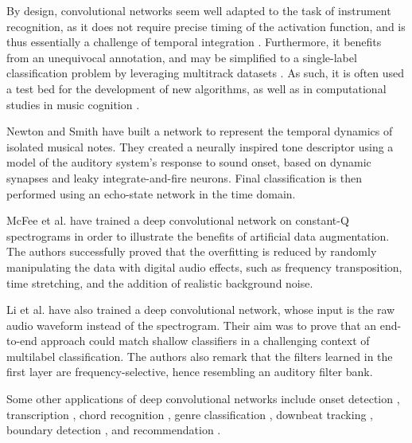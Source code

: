 \documentclass{article}
\makeatletter
\newcommand*{\etal}{et al.\@\xspace}
\makeatother
\begin{document}
By design, convolutional networks seem well adapted to the task of
instrument recognition, as it does not require precise timing of the activation function,
and is thus essentially a challenge of temporal integration \cite{Eronen2000, Joder2009}.
Furthermore, it benefits from an unequivocal annotation, and may be simplified
to a single-label classification problem by leveraging multitrack datasets \cite{Bittner2014}.
As such, it is often used a test bed for the development of new algorithms,
as well as in computational studies in music cognition \cite{Patil2012}.

Newton and Smith \cite{Newton2012} have built a network to represent the temporal 
dynamics of isolated musical notes.
They created a neurally inspired tone descriptor using a model of the auditory system's 
response to sound onset, based on dynamic synapses and leaky integrate-and-fire neurons.  
Final classification is then performed using an echo-state network in the time domain.

McFee \etal \cite{McFee2015-muda} have trained a deep convolutional network on
constant-Q spectrograms in order to illustrate the benefits of artificial data augmentation.
The authors successfully proved that the overfitting is reduced by randomly
manipulating the data with digital audio effects, such as
frequency transposition, time stretching, and the addition of realistic background noise.

Li \etal \cite{Li2015} have also trained a deep convolutional network, whose input is
the raw audio waveform instead of the spectrogram.
Their aim was to prove that an end-to-end approach could match shallow classifiers
in a challenging context of multilabel classification.
The authors also remark that the filters learned in the first layer are
frequency-selective, hence resembling an auditory filter bank.

Some other applications of deep convolutional networks include onset
detection \cite{Schluter2014}, transcription \cite{Sigtia2015},
chord recognition \cite{Humphrey2012tonnetz},
genre classification \cite{Choi2015},
downbeat tracking \cite{Durand2016},
boundary detection \cite{Ullrich2014}, and
recommendation \cite{vandenOord2013}.
\end{document}
